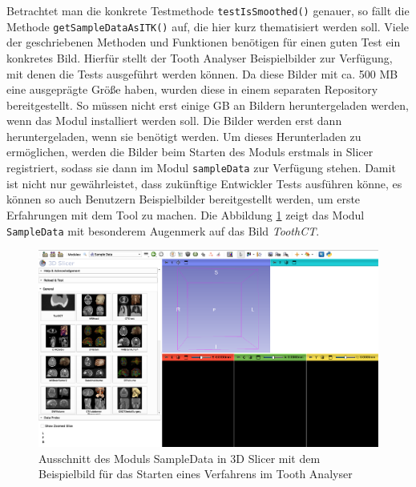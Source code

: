 Betrachtet man die konkrete Testmethode \texttt{testIsSmoothed()} genauer, so
fällt die Methode \texttt{getSampleDataAsITK()} auf, die hier kurz thematisiert
werden soll. Viele der geschriebenen Methoden und Funktionen benötigen für einen
guten Test ein konkretes Bild. Hierfür stellt der Tooth Analyser Beispielbilder
zur Verfügung, mit denen die Tests ausgeführt werden können. Da diese Bilder mit
ca. 500 \ac{MB} eine ausgeprägte Größe haben, wurden diese in einem separaten Repository
bereitgestellt. So müssen nicht erst einige \ac{GB} an Bildern heruntergeladen werden,
wenn das Modul installiert werden soll. Die Bilder werden erst dann heruntergeladen,
wenn sie benötigt werden. Um dieses Herunterladen zu ermöglichen, werden die
Bilder beim Starten des Moduls erstmals in Slicer registriert, sodass sie dann im
Modul \texttt{sampleData} zur Verfügung stehen. Damit ist nicht nur gewährleistet,
dass zukünftige Entwickler Tests ausführen könne, es können so auch Benutzern Beispielbilder
bereitgestellt werden, um erste Erfahrungen mit dem Tool zu machen. Die Abbildung
\ref{fig:sample_data} zeigt das Modul \texttt{SampleData} mit besonderem
Augenmerk auf das Bild \textit{ToothCT}.

\begin{figure}[h]
	\centering
	\includegraphics[width=1\textwidth]{img/sampleData.png}
	\caption{Ausschnitt des Moduls SampleData in 3D Slicer mit dem Beispielbild
	für das Starten eines Verfahrens im Tooth Analyser}
	\label{fig:sample_data}
\end{figure}

